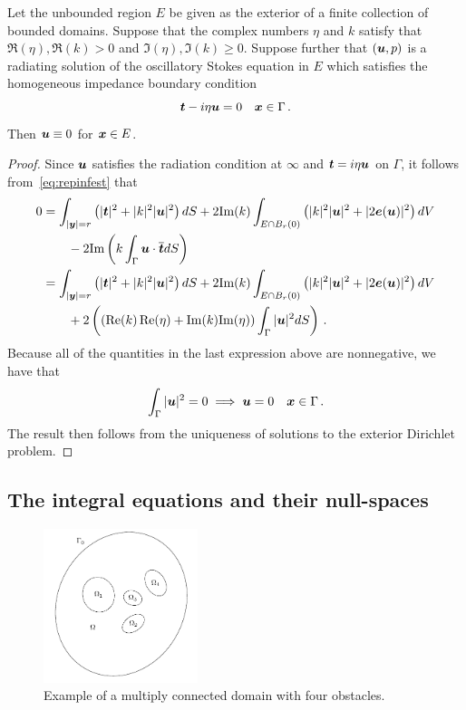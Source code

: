 \begin{thrm}
  Let the unbounded region $E$ be given as the exterior
  of a finite collection of bounded domains.
  Suppose that the complex numbers $\eta$ and $k$ satisfy that
  $\Re(\eta), \Re(k) > 0$ and $\Im(\eta),\Im(k) \geq 0$.
  Suppose further that
  $({\boldsymbol u},p)$ is a radiating solution of the
  oscillatory Stokes equation in $E$ which satisfies
  the homogeneous impedance boundary condition
  \begin{equation}
{\boldsymbol t} - i \eta {\boldsymbol u} = 0 \quad {\boldsymbol x} \in \Gamma \, . \nonumber
\end{equation}
Then ${\boldsymbol u} \equiv 0$ for ${\boldsymbol x} \in E$.
\end{thrm}

\begin{proof}
Since ${\boldsymbol u}$ satisfies the radiation condition at $\infty$ and ${\boldsymbol t} = i\eta {\boldsymbol u}$
on $\Gamma$, it follows from~\cref{eq:repinfest} that
\begin{align*}
0 &=
\int_{|{\boldsymbol y}|=r} \left( |{\boldsymbol t}|^2 + |k|^2 |{\boldsymbol u}|^2 \right) dS +
2 \text{Im}(k) \int_{E \cap B_{r}(0)} \left(|k|^2 |{\boldsymbol u}|^2 + |2{\boldsymbol e}({\boldsymbol u})|^2 \right)
dV \nonumber \\
& \qquad - 2 \text{Im} \left( k \int_{\Gamma} {\boldsymbol u} \cdot \overline{{\boldsymbol t}} dS  \right) \\
&= 
\int_{|{\boldsymbol y}|=r} \left( |{\boldsymbol t}|^2 + |k|^2 |{\boldsymbol u}|^2 \right) dS +
2 \text{Im}(k) \int_{E \cap B_{r}(0)} \left(|k|^2 |{\boldsymbol u}|^2 + |2{\boldsymbol e}({\boldsymbol u})|^2 \right)
dV \nonumber \\
& \qquad + 2 \left( \left (\operatorname{Re}(k)\operatorname{Re}(\eta) + {\textrm{\textup{Im}}}(k){\textrm{\textup{Im}}}(\eta)
\right ) \int_{\Gamma} |{\boldsymbol u}|^{2} dS  \right)
\, .
\end{align*}
Because all of the quantities in the last expression above are
nonnegative, we have that
\begin{equation}
  \int_{\Gamma} |{\boldsymbol u}|^{2} = 0 \implies {\boldsymbol u} = 0  \quad {\boldsymbol x} \in \Gamma \, .
  \nonumber
\end{equation}
The result then follows from the uniqueness of solutions to the exterior
Dirichlet problem.
\end{proof}

\subsection{The integral equations and their null-spaces}

\begin{figure}
\begin{center}
\includegraphics[width=0.4\textwidth]{media/mc_dom}
\end{center}
\caption{Example of a multiply connected domain with four obstacles.}
\label{fig:mc_dom}
\end{figure}

